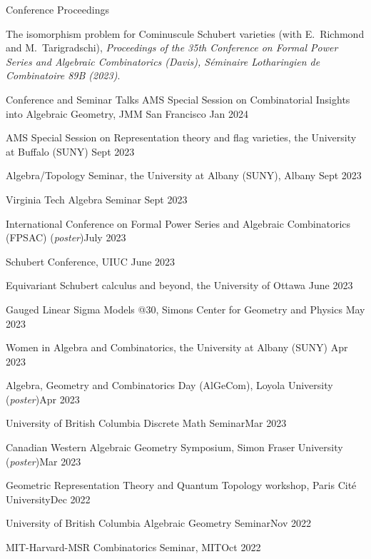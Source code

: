 \documentclass{resume} %
\begin{document}
\begin{rSection}{Conference Proceedings}
    \begin{etaremune}
        \item The isomorphism problem for Cominuscule Schubert varieties (with E.~Richmond and M.~Tarigradschi), \emph{Proceedings of the 35th Conference on Formal Power Series and Algebraic Combinatorics (Davis), Séminaire Lotharingien de Combinatoire 89B (2023)}. 
    \end{etaremune}
\end{rSection}

\begin{rSection}{Conference and Seminar Talks}
    AMS Special Session on Combinatorial Insights into Algebraic Geometry, JMM San Francisco \hfill{Jan 2024} 

    AMS Special Session on Representation theory and flag varieties, the  University at Buffalo (SUNY) \hfill{Sept 2023}

    Algebra/Topology Seminar, the University at Albany (SUNY), Albany \hfill{Sept 2023}

    Virginia Tech Algebra Seminar \hfill{Sept 2023}

    International Conference on Formal Power Series and Algebraic Combinatorics (FPSAC) (\emph{poster})\hfill{July 2023}

    Schubert Conference, UIUC \hfill{June 2023}

    Equivariant Schubert calculus and beyond, the University of Ottawa \hfill{June 2023}

    Gauged Linear Sigma Models @30, Simons Center for Geometry and Physics \hfill{May 2023}

    Women in Algebra and Combinatorics, the University at Albany (SUNY) \hfill{Apr 2023} 

    Algebra, Geometry and Combinatorics Day (AlGeCom), Loyola University (\emph{poster})\hfill{Apr 2023} 

    University of British Columbia Discrete Math Seminar\hfill{Mar 2023} 

    Canadian Western Algebraic Geometry Symposium, Simon Fraser University (\emph{poster})\hfill{Mar 2023}

    Geometric Representation Theory and Quantum Topology workshop, Paris Cité University\hfill{Dec 2022}

    University of British Columbia Algebraic Geometry Seminar\hfill{Nov 2022} 

    MIT-Harvard-MSR Combinatorics Seminar, MIT\hfill{Oct 2022}


\end{rSection}
\end{document}
